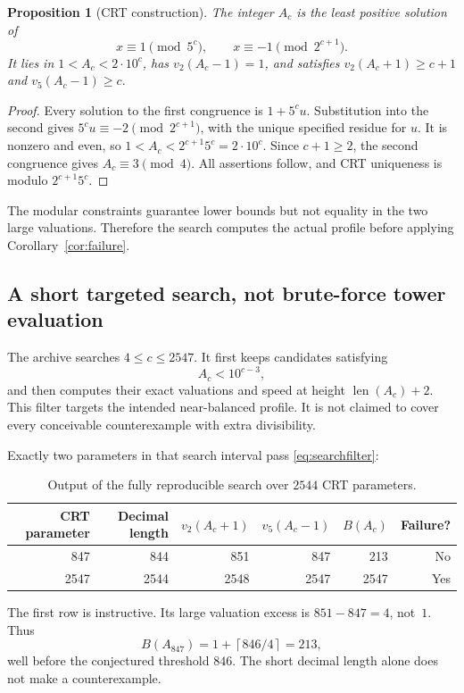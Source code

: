 \documentclass[11pt,a4paper]{article}
\newtheorem{proposition}[theorem]{Proposition}
\theoremstyle{definition}
\theoremstyle{remark}
\newcommand{\len}{\operatorname{len}}
\newcommand{\ceil}[1]{\left\lceil #1\right\rceil}
\begin{document}
\begin{proposition}[CRT construction]\label{prop:CRT}
The integer $A_c$ is the least positive solution of
\[
 x\equiv1\pmod{5^c},\qquad x\equiv-1\pmod{2^{c+1}}.
\]
It lies in $1<A_c<2\cdot10^c$, has $v_2(A_c-1)=1$, and satisfies
$v_2(A_c+1)\ge c+1$ and $v_5(A_c-1)\ge c$.
\end{proposition}
\begin{proof}
Every solution to the first congruence is $1+5^c u$. Substitution into the second gives $5^c u\equiv-2\pmod{2^{c+1}}$, with the unique specified residue for $u$. It is nonzero and even, so $1<A_c<2^{c+1}5^c=2\cdot10^c$. Since $c+1\ge2$, the second congruence gives $A_c\equiv3\pmod4$. All assertions follow, and CRT uniqueness is modulo $2^{c+1}5^c$.
\end{proof}

The modular constraints guarantee lower bounds but not equality in the two large valuations. Therefore the search computes the actual profile before applying Corollary~\ref{cor:failure}.

\subsection{A short targeted search, not brute-force tower evaluation}
The archive searches $4\le c\le2547$. It first keeps candidates satisfying
\begin{equation}\label{eq:searchfilter}
 A_c<10^{c-3},
\end{equation}
and then computes their exact valuations and speed at height $\len(A_c)+2$. This filter targets the intended near-balanced profile. It is not claimed to cover every conceivable counterexample with extra divisibility.

Exactly two parameters in that search interval pass \eqref{eq:searchfilter}:
\begin{table}[ht]
\centering
\small
\begin{tabular}{@{}rrrrrr@{}}
\toprule
CRT parameter & Decimal length & $v_2(A_c+1)$ & $v_5(A_c-1)$ & $B(A_c)$ & Failure?\\
\midrule
847 & 844 & 851 & 847 & 213 & No\\
2547 & 2544 & 2548 & 2547 & 2547 & Yes\\
\bottomrule
\end{tabular}
\caption{Output of the fully reproducible search over $2544$ CRT parameters.}
\label{tab:search}
\end{table}

The first row is instructive. Its large valuation excess is $851-847=4$, not~$1$. Thus
\[
 B(A_{847})=1+\ceil{846/4}=213,
\]
well before the conjectured threshold $846$. The short decimal length alone does not make a counterexample.
\end{document}
